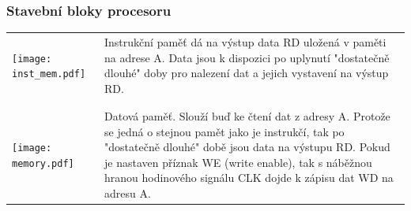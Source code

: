 \documentclass{beamer}
\begin{document}
\begin{frame}
\frametitle{Stavební bloky procesoru}

\begin{table}
\footnotesize
\begin{tabular}{m{1.7cm} m{9.4cm}}
\hfill \texttt{[image: inst\_mem.pdf]} & Instrukční paměť dá na výstup data RD uložená v paměti na adrese A. Data jsou k dispozici po uplynutí "dostatečně dlouhé" doby pro nalezení dat a jejich vystavení na výstup RD.\\
\phantom{X} & \phantom{X} \\
\phantom{X} & \phantom{X} \\
\hfill \texttt{[image: memory.pdf]} & Datová paměť. Slouží buď ke čtení dat z adresy A. Protože se jedná o stejnou pamět jako je instrukčí, tak po "dostatečně dlouhé" době jsou data na výstupu RD. Pokud je nastaven příznak WE (write enable), tak s náběžnou hranou hodinového signálu CLK dojde k zápisu dat WD na adresu A.\\ 
\end{tabular}
\end{table}

\end{frame}
\end{document}

